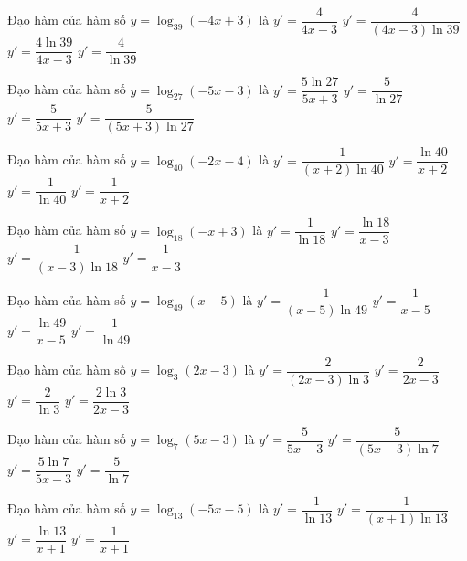 \documentclass[12pt,a4paper]{article}
\begin{document}
\begin{ex}
Đạo hàm của hàm số $y=\log_{39}(-4x+3)$ là
\choice
{$y'=\dfrac{4}{4x-3}$}
{\True $y'=\dfrac{4}{(4x-3)\ln 39}$}
{$y'=\dfrac{4\ln{39}}{4x-3}$}
{$y'=\dfrac{4}{\ln{39}}$}
\end{ex}
\begin{ex}
Đạo hàm của hàm số $y=\log_{27}(-5x-3)$ là
\choice
{$y'=\dfrac{5\ln{27}}{5x+3}$}
{$y'=\dfrac{5}{\ln{27}}$}
{$y'=\dfrac{5}{5x+3}$}
{\True $y'=\dfrac{5}{(5x+3)\ln 27}$}
\end{ex}
\begin{ex}
Đạo hàm của hàm số $y=\log_{40}(-2x-4)$ là
\choice
{\True $y'=\dfrac{1}{(x+2)\ln 40}$}
{$y'=\dfrac{\ln{40}}{x+2}$}
{$y'=\dfrac{1}{\ln{40}}$}
{$y'=\dfrac{1}{x+2}$}
\end{ex}
\begin{ex}
Đạo hàm của hàm số $y=\log_{18}(-x+3)$ là
\choice
{$y'=\dfrac{1}{\ln{18}}$}
{$y'=\dfrac{\ln{18}}{x-3}$}
{\True $y'=\dfrac{1}{(x-3)\ln 18}$}
{$y'=\dfrac{1}{x-3}$}
\end{ex}
\begin{ex}
Đạo hàm của hàm số $y=\log_{49}(x-5)$ là
\choice
{\True $y'=\dfrac{1}{(x-5)\ln 49}$}
{$y'=\dfrac{1}{x-5}$}
{$y'=\dfrac{\ln{49}}{x-5}$}
{$y'=\dfrac{1}{\ln{49}}$}
\end{ex}
\begin{ex}
Đạo hàm của hàm số $y=\log_3(2x-3)$ là
\choice
{\True $y'=\dfrac{2}{(2x-3)\ln 3}$}
{$y'=\dfrac{2}{2x-3}$}
{$y'=\dfrac{2}{\ln{3}}$}
{$y'=\dfrac{2\ln{3}}{2x-3}$}
\end{ex}
\begin{ex}
Đạo hàm của hàm số $y=\log_7(5x-3)$ là
\choice
{$y'=\dfrac{5}{5x-3}$}
{\True $y'=\dfrac{5}{(5x-3)\ln 7}$}
{$y'=\dfrac{5\ln{7}}{5x-3}$}
{$y'=\dfrac{5}{\ln{7}}$}
\end{ex}
\begin{ex}
Đạo hàm của hàm số $y=\log_{13}(-5x-5)$ là
\choice
{$y'=\dfrac{1}{\ln{13}}$}
{\True $y'=\dfrac{1}{(x+1)\ln 13}$}
{$y'=\dfrac{\ln{13}}{x+1}$}
{$y'=\dfrac{1}{x+1}$}
\end{ex}
\end{document}
